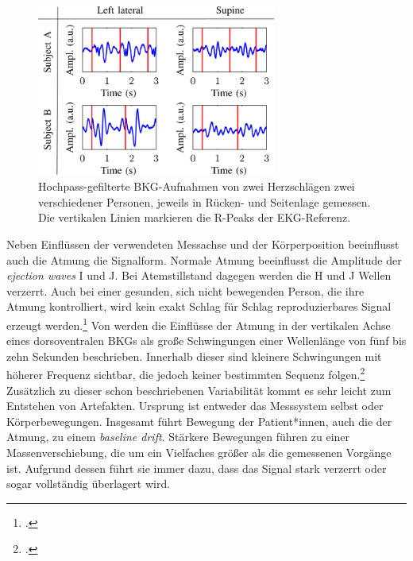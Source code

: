 	\begin{figure}[H]
		\centering
		\includegraphics[width=0.7\textwidth]{pic/bcg2postures.png}
		\caption[\ac{BKG}-Aufnahmen in Rücken- und Seitenlage]{Hochpass-gefilterte \ac{BKG}-Aufnahmen von zwei Herzschlägen zwei verschiedener Personen, jeweils in Rücken- und Seitenlage gemessen. Die vertikalen Linien markieren die R-Peaks der EKG-Referenz.\protect\footnotemark}
		\label{fig:bcg2postures}
	\end{figure}
	
	Neben Einflüssen der verwendeten Messachse und der Körperposition beeinflusst auch die Atmung die Signalform. Normale Atmung beeinflusst die Amplitude der \textit{ejection waves} I und J. Bei Atemstillstand dagegen werden die H und J Wellen verzerrt. Auch bei einer gesunden, sich nicht bewegenden Person, die ihre Atmung kontrolliert, wird kein exakt Schlag für Schlag reproduzierbares Signal erzeugt werden.\footcite[Vgl.][]{Pinheiro2010} Von \citeauthor{Zink2017} werden die Einflüsse der Atmung in der vertikalen Achse eines dorsoventralen \ac{BKG}s als große Schwingungen einer Wellenlänge von fünf bis zehn Sekunden beschrieben. Innerhalb dieser sind kleinere Schwingungen mit höherer Frequenz sichtbar, die jedoch keiner bestimmten Sequenz folgen.\footcite[Vgl.][]{Zink2017} Zusätzlich zu dieser schon beschriebenen Variabilität kommt es sehr leicht zum Entstehen von Artefakten. Ursprung ist entweder das Messsystem selbst oder Körperbewegungen. Insgesamt führt Bewegung der Patient*innen, auch die der Atmung, zu einem \textit{baseline drift}. Stärkere Bewegungen führen zu einer Massenverschiebung, die um ein Vielfaches größer als die gemessenen Vorgänge ist. Aufgrund dessen führt sie immer dazu, dass das Signal stark verzerrt oder sogar vollständig überlagert wird.


